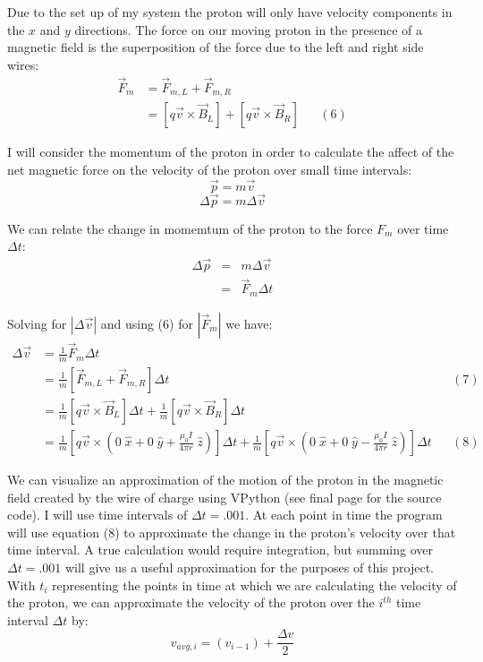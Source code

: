 \documentclass[11pt]{article}
\begin{document}
\newpage

\noindent Due to the set up of my system the proton will only have velocity components in the $x$ and $y$ directions. The force on our moving proton in the presence of a magnetic field is the superposition of the force due to the left and right side wires:
\begin{align*}
\vec{F}_m&=\vec{F}_{m,L}+\vec{F}_{m,R}\\&=\left[q\vec{v}\times\vec{B}_L\right]+\left[q\vec{v}\times\vec{B}_R\right]&&(6)
\end{align*}

\vspace{.2in}

\noindent I will consider the momentum of the proton in order to calculate the affect of the net magnetic force on the velocity of the proton over small time intervals:
\[
\vec{p}=m\vec{v}
\] 
\[
\Delta\vec{p}=m\Delta\vec{v}
\]

\vspace{.2in}

\noindent We can relate the change in momemtum of the proton to the force $F_m$ over time $\Delta t$:
\begin{eqnarray*}
\Delta\vec{p}&=&m\Delta\vec{v}\\&=&\vec{F}_m\Delta t
\end{eqnarray*}

\vspace{.2in}

\noindent Solving for $\left|\Delta\vec{v}\right|$ and using (6) for $\left|\vec{F}_m\right|$ we have:
\begin{align*}
\Delta\vec{v}&=\frac{1}{m}\vec{F}_m\Delta t\\&=\frac{1}{m}\left[\vec{F}_{m,L}+\vec{F}_{m,R}\right]\Delta t&&(7)\\&=\frac{1}{m}\left[q\vec{v}\times\vec{B}_L\right]\Delta t + \frac{1}{m}\left[q\vec{v}\times\vec{B}_R\right]\Delta t\\&=\frac{1}{m}\left[q\vec{v}\times\left(0\;\hat{x}+0\;\hat{y}+\frac{\mu_0I}{4\pi r}\;\hat{z}\right)\right]\Delta t + \frac{1}{m}\left[q\vec{v}\times\left(0\;\hat{x}+0\;\hat{y}-\frac{\mu_0I}{4\pi r}\;\hat{z}\right)\right]\Delta t&&(8)
\end{align*} 

\vspace{.2in}

\noindent We can visualize an approximation of the motion of the proton in the magnetic field created by the wire of charge using VPython (see final page for the source code). I will use time intervals of $\Delta t=.001$. At each point in time the program will use equation (8) to approximate the change in the proton's velocity over that time interval. A true calculation would require integration, but summing over $\Delta t=.001$ will give us a useful approximation for the purposes of this project. With $t_i$ representing the points in time at which we are calculating the velocity of the proton, we can approximate the velocity of the proton over the $i^{th}$ time interval $\Delta t$ by:
\[
v_{avg,i}=\left(v_{i-1}\right)+\frac{\Delta v}{2}
\]
\end{document}
